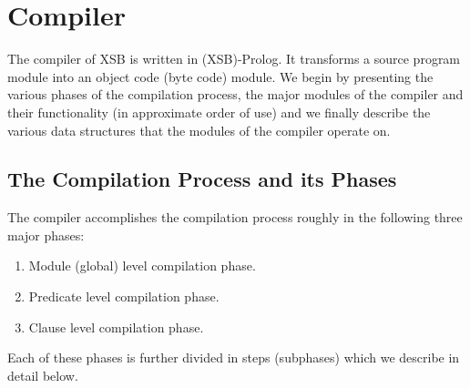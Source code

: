 \section{Compiler}

The compiler of XSB is written in (XSB)-Prolog. It transforms
a source program module into an object code (byte code) module.
We begin by presenting the various phases of the compilation
process, the major modules of the compiler and their functionality
(in approximate order of use) and we finally describe the various
data structures that the modules of the compiler operate on.

\subsection{The Compilation Process and its Phases}
The compiler accomplishes the compilation process roughly in the
following three major phases:
\begin{enumerate}
\item	Module (global) level compilation phase.
\item	Predicate level compilation phase.
\item	Clause level compilation phase.
\end{enumerate}

Each of these phases is further divided in steps (subphases) 
which we describe in detail below.

